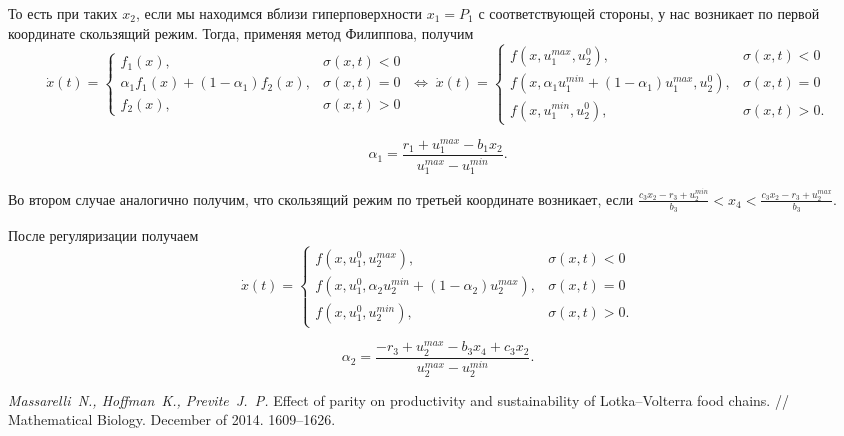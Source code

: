 \documentclass[11pt]{article}
\begin{document}
То есть при таких $x_2$, если мы находимся вблизи гиперповерхности $x_1 = P_1$ с соответствующей стороны, у нас возникает по первой координате скользящий режим. Тогда, применяя метод Филиппова, получим 
$$
\dot x(t) = \begin{cases} f_1(x), & \sigma(x,t) < 0 \\ \alpha_1 f_1(x) + (1 - \alpha_1) f_2(x), & \sigma(x,t) = 0 \\ f_2(x), & \sigma(x,t) > 0\end{cases} \; \Leftrightarrow \; \dot x(t) = \begin{cases} f(x,u_1^{max}, u_2^0), & \sigma(x,t) < 0 \\ f(x, \alpha_1 u_1^{min} + (1-\alpha_1)u_1^{max}, u_2^0), & \sigma(x,t) = 0 \\ f(x, u_1^{min}, u_2^0), & \sigma(x,t) > 0.\end{cases}
$$

$$\alpha_1 = \frac{r_1 + u_1^{max} - b_1x_2}{u_1^{max} - u_1^{min}}.$$

Во втором случае аналогично получим, что скользящий режим по третьей координате возникает, если $\frac{c_3x_2 - r_3 + u_2^{min}}{b_3} < x_4 < \frac{c_3x_2 - r_3 + u_2^{max}}{b_3}.$

После регуляризации получаем
$$
\dot x(t) = \begin{cases} f(x,u_1^0, u_2^{max}), & \sigma(x,t) < 0 \\ f(x, u_1^0, \alpha_2 u_2^{min} + (1-\alpha_2)u_2^{max}), & \sigma(x,t) = 0 \\ f(x, u_1^0, u_2^{min}), & \sigma(x,t) > 0.\end{cases}
$$

$$\alpha_2 = \frac{-r_3 + u_2^{max} - b_3x_4 + c_3x_2}{u_2^{max} - u_2^{min}}.$$




\clearpage
\newpage
\begin{thebibliography}{0}
 {\it Massarelli~N., Hoffman~K., Previte~J.~P.} Effect of parity on productivity and sustainability of Lotka–Volterra food chains. // Mathematical Biology. December of 2014. 1609--1626.
\end{thebibliography}
\end{document}
